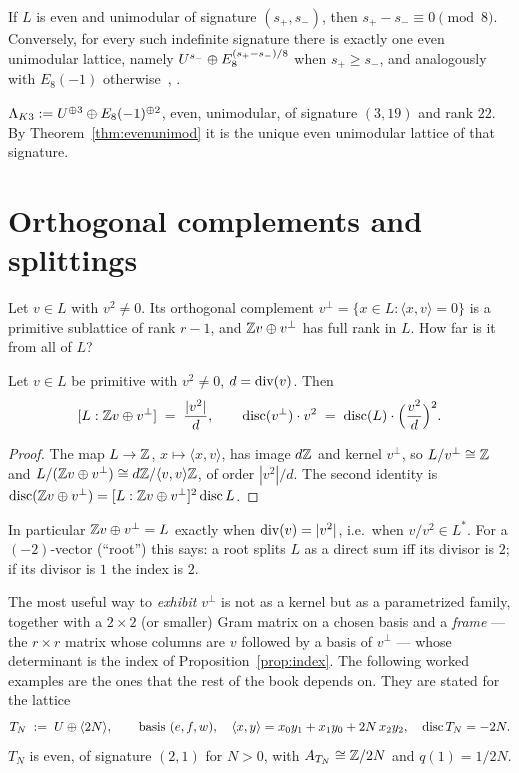 \begin{theorem}\label{thm:evenunimod}
If $L$ is even and unimodular of signature $(s_+,s_-)$, then
$s_+-s_-\equiv0\pmod 8$. Conversely, for every such indefinite signature there
is exactly one even unimodular lattice, namely
$U^{s_-}\oplus E_8^{(s_+-s_-)/8}$ when $s_+\ge s_-$, and analogously with
$E_8(-1)$ otherwise~\cite[Ch.~V]{Serre1973}, \cite[Thm.~14.1.1]{Huybrechts2016}.
\end{theorem}

\begin{definition}
$\Lambda_{K3}:=U^{\oplus3}\oplus E_8(-1)^{\oplus2}$, even, unimodular, of
signature $(3,19)$ and rank $22$. By Theorem~\ref{thm:evenunimod} it is the
unique even unimodular lattice of that signature.
\end{definition}

\section{Orthogonal complements and splittings}

Let $v\in L$ with $v^2\neq0$. Its orthogonal complement
$v^{\perp}=\{x\in L:\langle x,v\rangle=0\}$ is a primitive sublattice of rank
$r-1$, and $\mathbb{Z} v\oplus v^{\perp}$ has full rank in $L$. How far is it from all
of $L$?

\begin{proposition}\label{prop:index}
Let $v\in L$ be primitive with $v^2\neq0$, $d=\operatorname{div}(v)$. Then
\[
  [L:\mathbb{Z} v\oplus v^{\perp}] \;=\; \frac{|v^2|}{d},
  \qquad
  \operatorname{disc}(v^{\perp})\cdot v^2 \;=\; \operatorname{disc}(L)\cdot\Bigl(\frac{v^2}{d}\Bigr)^2 .
\]
\end{proposition}

\begin{proof}
The map $L\to\mathbb{Z}$, $x\mapsto\langle x,v\rangle$, has image $d\mathbb{Z}$ and kernel
$v^{\perp}$, so $L/v^{\perp}\cong\mathbb{Z}$ and $L/(\mathbb{Z} v\oplus v^{\perp})\cong
d\mathbb{Z}/\langle v,v\rangle\mathbb{Z}$, of order $|v^2|/d$. The second identity is
$\operatorname{disc}(\mathbb{Z} v\oplus v^{\perp})=[L:\mathbb{Z} v\oplus v^{\perp}]^2\operatorname{disc} L$.
\end{proof}

In particular $\mathbb{Z} v\oplus v^{\perp}=L$ exactly when $\operatorname{div}(v)=|v^2|$, i.e.\
when $v/v^2\in L^*$. For a $(-2)$-vector (``root'') this says: a root splits
$L$ as a direct sum iff its divisor is $2$; if its divisor is $1$ the index is
$2$.

The most useful way to \emph{exhibit} $v^{\perp}$ is not as a kernel but as a
parametrized family, together with a $2\times2$ (or smaller) Gram matrix on a
chosen basis and a \emph{frame} --- the $r\times r$ matrix whose columns are
$v$ followed by a basis of $v^{\perp}$ --- whose determinant is the index of
Proposition~\ref{prop:index}. The following worked examples are the ones that
the rest of the book depends on. They are stated for the lattice
\[
  T_N \;:=\; U\oplus\langle 2N\rangle,\qquad
  \text{basis }(e,f,w),\quad
  \langle x,y\rangle = x_0y_1+x_1y_0+2N\,x_2y_2,\quad \operatorname{disc} T_N=-2N .
\]
$T_N$ is even, of signature $(2,1)$ for $N>0$, with $A_{T_N}\cong\mathbb{Z}/2N$ and
$q(1)=1/2N$.

